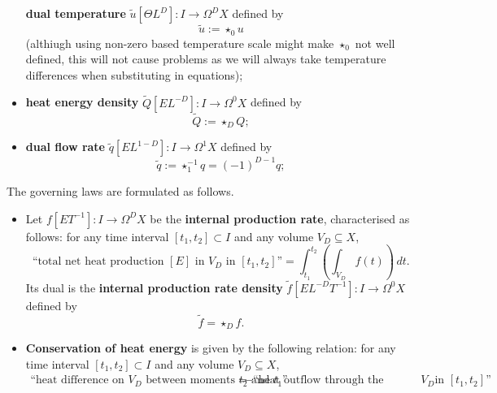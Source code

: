 \begin{discussion}
\begin{itemize}
      \textbf{dual temperature}
      $\tilde{u} [\Theta L^D] \colon I \to \Omega^D X$ defined by
      \begin{equation}
        \tilde{u} := \star_0 u
      \end{equation}
      (althiugh using non-zero based temperature scale might make $\star_0$ not
      well defined, this will not cause problems as we will always take
      temperature differences when substituting in equations);
    \item
      \textbf{heat energy density}
      $\tilde{Q} [E L^{-D}] \colon I \to \Omega^0 X$ defined by
      \begin{equation}
        \tilde{Q} := \star_D Q;
      \end{equation}
    \item
      \textbf{dual flow rate}
      $\tilde{q} [E L^{1 - D}] \colon I \to \Omega^1 X$ defined by
      \begin{equation}
        \tilde{q} := \star_1^{-1} q = (-1)^{D - 1} q;
      \end{equation}
  \end{itemize}
  The governing laws are formulated as follows.
  \begin{itemize}
    \item
      Let $f [E T^{-1}] \colon I \to \Omega^D X$ be the
      \textbf{internal production rate}, characterised as follows:
      for any time interval $[t_1, t_2] \subset I$
      and any volume $V_D \subseteq X$,
      \begin{equation}
        \text{``total net heat production $[E]$ in $V_D$ in $[t_1, t_2]$''}
        = \int_{t_1}^{t_2} \left(\int_{V_D} f(t) \right)\, d t.
      \end{equation}
      Its dual is the \textbf{internal production rate density}
      $\tilde{f} [E L^{-D} T^{-1}] \colon I \to \Omega^0 X$ defined by
      \begin{equation}
        \tilde{f} = \star_D f.
      \end{equation}
    \item
      \textbf{Conservation of heat energy} is given by the following relation:
      for any time interval $[t_1, t_2] \subset I$
      and any volume $V_D \subseteq X$,
      \begin{equation}
        \begin{split}
        \text{``heat difference on $V_D$ between moments $t_2$ and $t_1$''} =
        & - \text{``heat outflow through the boundary of $V_D$
          in $[t_1, t_2]$''} \\

\end{split}
\end{equation}
\end{itemize}
\end{discussion}

